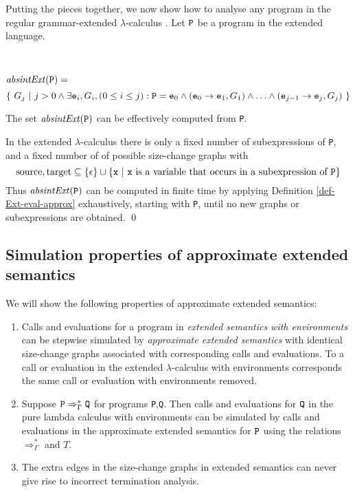 \documentclass{LMCS}
\newcommand{\fl}{\noindent}
\newcommand{\be}{\begin{enumerate}}
\newcommand{\ee}{\end{enumerate}}
\newcommand{\bdfn}{\begin{defi}}
\newcommand{\edfn}{\end{defi}}
\newcommand{\bprf}{\proof}
\newcommand{\eprf}{\qed}
\newcommand{\bthm}{\begin{thm}}
\newcommand{\ethm}{\end{thm}}
\theoremstyle{definition}\newtheorem{env}[thm]{Environment}
\begin{document}
Putting the pieces together, we now show how to analyse any program in the
regular grammar-extended $\lambda$-calculus . Let ${\tt P}$ be a program in the extended language.
\bdfn\ 

\fl ${\it absintExt}({\tt P}) = $
$$\{\ G_j\ |\ j>0 \land
   \exists{\tt e}_i,G_i,(0\leq i \leq j):
     {\tt P}={\tt e}_0 \land 
     ({\tt e}_0\to{\tt e}_{1},G_{1}) \land \ldots\land
     ({\tt e}_{j-1}\to{\tt e}_{j},G_{j})
     \ \}
$$

\edfn

\bthm The set  ${\it absintExt}({\tt P})$ can be effectively computed 
from {\tt P}.\ethm
\bprf 
In the extended $\lambda$-calculus there is only a fixed number of subexpressions of {\tt P}, and
a fixed number of  
of possible size-change graphs with 
$${\rm source, target} \subseteq \{\epsilon\}\cup\{{\tt x}\ |\ {\tt x} \mbox{\  is a variable that occurs in a subexpression of ${\tt P}$}\}$$
Thus ${\it absintExt}({\tt P})$
can be computed in finite time by applying Definition \ref{def-Ext-eval-approx}
exhaustively, starting with {\tt P}, until no new graphs or 
subexpressions are obtained.
\eprf 



\subsection{Simulation properties of approximate extended semantics}

We will show the following properties of approximate extended semantics: 
\be[(1)]
\item Calls and evaluations for a program in {\em extended semantics with environments} can be stepwise simulated by {\em approximate extended semantics} with identical size-change graphs associated with corresponding calls and evaluations. To a call or evaluation in the extended $\lambda$-calculus with environments corresponds the same call or evaluation with environments removed.
\item 
Suppose  ${\tt P}\Rightarrow^*_\Gamma {\tt Q}$ for programs  {\tt P},{\tt Q}. Then calls and evaluations for ${\tt Q}$ in the pure lambda calculus with environments can be simulated by calls and evaluations in the approximate extended semantics for ${\tt P}$ using the relations  $\Rightarrow^*_\Gamma $ 
and $T$.
\item The extra edges in the size-change graphs in extended semantics can never give rise to incorrect termination analysis.
\ee
\end{document}

